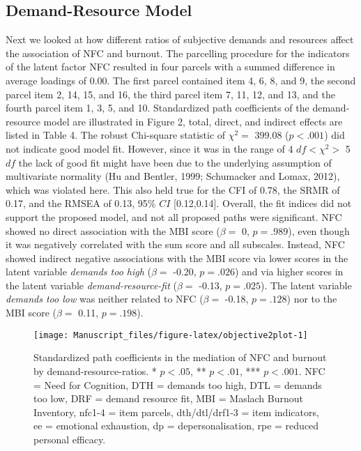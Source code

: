 \documentclass[
  english,
  man,floatsintext]{apa6}
\begin{document}
\hypertarget{demand-resource-model}{%
\subsection{Demand-Resource Model}\label{demand-resource-model}}

Next we looked at how different ratios of subjective demands and resources affect the association of NFC and burnout.
The parcelling procedure for the indicators of the latent factor NFC resulted in four parcels with a summed difference in average loadings of 0.00.
The first parcel contained item 4, 6, 8, and 9, the second parcel item 2, 14, 15, and 16, the third parcel item 7, 11, 12, and 13, and the fourth parcel item 1, 3, 5, and 10.
Standardized path coefficients of the demand-resource model are illustrated in Figure 2, total, direct, and indirect effects are listed in Table 4.
The robust Chi-square statistic of \(\chi^2=\) 399.08 (\(p < .001\)) did not indicate good model fit.
However, since it was in the range of 4 \(df<\chi^2>\) 5 \(df\) the lack of good fit might have been due to the underlying assumption of multivariate normality (Hu and Bentler, 1999; Schumacker and Lomax, 2012), which was violated here.
This also held true for the CFI of 0.78, the SRMR of 0.17, and the RMSEA of 0.13, 95\% \(CI\) {[}0.12,0.14{]}.
Overall, the fit indices did not support the proposed model, and not all proposed paths were significant.
NFC showed no direct association with the MBI score (\(\beta=\) 0, \(p=.989\)), even though it was negatively correlated with the sum score and all subscales.
Instead, NFC showed indirect negative associations with the MBI score via lower scores in the latent variable \emph{demands too high} (\(\beta=\) -0.20, \(p=.026\)) and via higher scores in the latent variable \emph{demand-resource-fit} (\(\beta=\) -0.13, \(p=.025\)).
The latent variable \emph{demands too low} was neither related to NFC (\(\beta=\) -0.18, \(p=.128\)) nor to the MBI score (\(\beta=\) 0.11, \(p=.198\)).

\begin{figure}[H]
\texttt{[image: Manuscript\_files/figure-latex/objective2plot-1]} \caption{Standardized path coefficients in the mediation of NFC and burnout by demand-resource-ratios. * $p<.05$, ** $p<.01$, *** $p<.001$. NFC = Need for Cognition, DTH = demands too high, DTL = demands too low, DRF = demand resource fit, MBI = Maslach Burnout Inventory, nfc1-4 = item parcels, dth/dtl/drf1-3 = item indicators, ee = emotional exhaustion, dp = depersonalisation, rpe = reduced personal efficacy.}\label{fig:objective2plot}
\end{figure}
\end{document}
